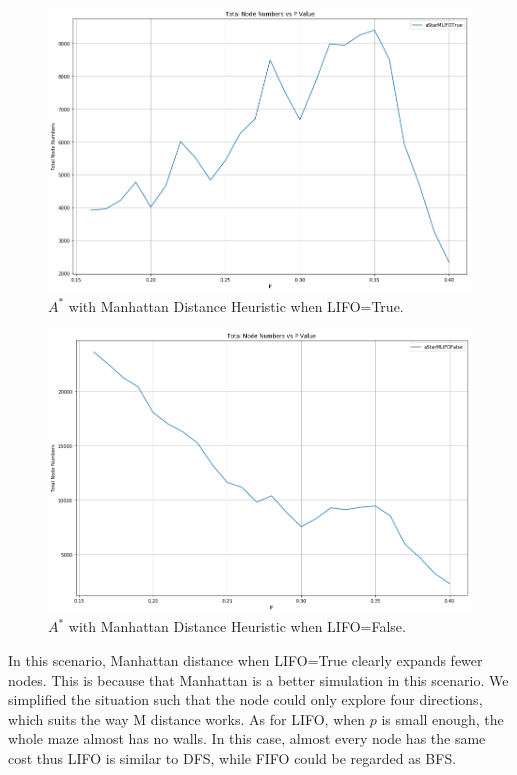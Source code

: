 \documentclass[letter]{article}
\begin{document}
\begin{questions}
	\begin{figure}
		\centering
		\includegraphics[width=\textwidth]{../pics/question6-2.png}
		\caption{\label{fig:6-2} $ A^* $ with Manhattan Distance Heuristic when LIFO=True.}
	\end{figure}

	\begin{figure}
		\centering
		\includegraphics[width=\textwidth]{../pics/question6-3.png}
		\caption{\label{fig:6-3}$ A^* $ with Manhattan Distance Heuristic when LIFO=False.}
	\end{figure}

	In this scenario, Manhattan distance when LIFO=True clearly expands fewer nodes. This is because that Manhattan is a better simulation in this scenario. We simplified the situation such that the node could only explore four directions, which suits the way M distance works. As for LIFO, when $ p $ is small enough, the whole maze almost has no walls. In this case, almost every node has the same cost thus LIFO is similar to DFS, while FIFO could be regarded as BFS. \\
	

\end{questions}
\end{document}

